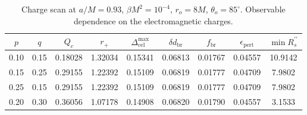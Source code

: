 \begin{table}[t]
\centering
\caption{Charge scan at $a/M=0.93$, $\beta M^2=10^{-4}$, $r_o=8M$, $\theta_o=85^\circ$. Observable dependence on the electromagnetic charges.}
\begin{tabular}{ccccccccc}
\hline
$p$ & $q$ & $Q_c$ & $r_+$ & $\Delta_{\mathrm{cel}}^{\max}$ & $\delta d_{\mathrm{br}}$ & $f_{\mathrm{br}}$ & $\epsilon_{\mathrm{pert}}$ & $\min R_s^{\prime\prime}$ \\
\hline
0.10 & 0.15 & 0.18028 & 1.32034 & 0.15341 & 0.06813 & 0.01767 & 0.04557 & 10.9142 \\
0.15 & 0.25 & 0.29155 & 1.22392 & 0.15109 & 0.06819 & 0.01777 & 0.04709 & 7.9802 \\
0.25 & 0.15 & 0.29155 & 1.22392 & 0.15109 & 0.06819 & 0.01777 & 0.04709 & 7.9802 \\
0.20 & 0.30 & 0.36056 & 1.07178 & 0.14908 & 0.06820 & 0.01790 & 0.04557 & 3.1533 \\
\hline
\end{tabular}
\end{table}
